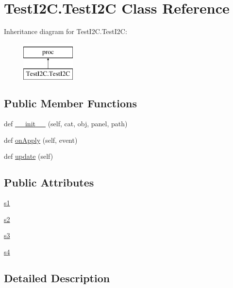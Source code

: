 \hypertarget{classTestI2C_1_1TestI2C}{}\section{Test\+I2\+C.\+Test\+I2C Class Reference}
\label{classTestI2C_1_1TestI2C}
Inheritance diagram for Test\+I2\+C.\+Test\+I2C\+:\begin{figure}[H]
\begin{center}
\leavevmode
\includegraphics[height=2.000000cm]{classTestI2C_1_1TestI2C}
\end{center}
\end{figure}
\subsection*{Public Member Functions}
\begin{DoxyCompactItemize}
\item 
def \hyperlink{classTestI2C_1_1TestI2C_ab3283d2bcd0fe2782094a799ef259334}{\+\_\+\+\_\+init\+\_\+\+\_\+} (self, cat, obj, panel, path)
\item 
def \hyperlink{classTestI2C_1_1TestI2C_a6737e8674436af268fa39e4d6ebea064}{on\+Apply} (self, event)
\item 
def \hyperlink{classTestI2C_1_1TestI2C_aa09430186d2af74fae791a1af932db65}{update} (self)
\end{DoxyCompactItemize}
\subsection*{Public Attributes}
\begin{DoxyCompactItemize}
\item 
\hyperlink{classTestI2C_1_1TestI2C_a74973f987e57f6b47208b6a7438c951f}{s1}
\item 
\hyperlink{classTestI2C_1_1TestI2C_a17d8f06f958baf5845484d3bd12b3d1b}{s2}
\item 
\hyperlink{classTestI2C_1_1TestI2C_a45a9468d8f8ebcf3948936beb23d84b3}{s3}
\item 
\hyperlink{classTestI2C_1_1TestI2C_a44f094cf9bfdc3969deae28d12e0d3c3}{s4}
\end{DoxyCompactItemize}


\subsection{Detailed Description}


